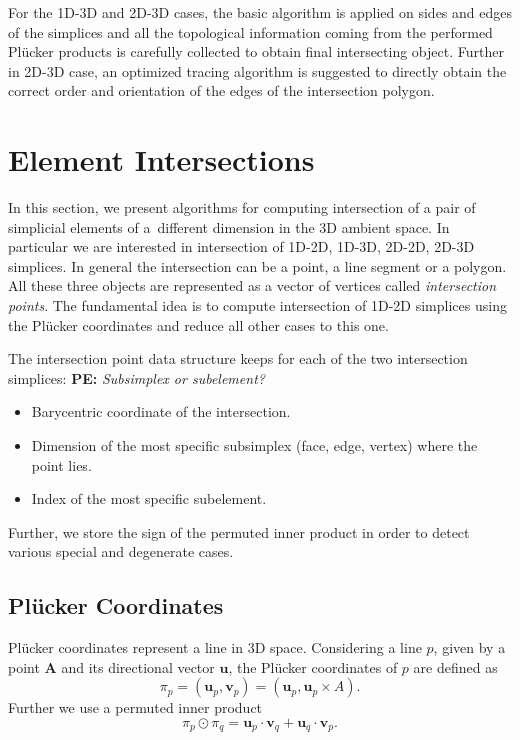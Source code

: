 \documentclass{elsarticle}
\newcommand{\figpath}{figures/}
\def\vc#1{\mathbf{\boldsymbol{#1}}}     %
\newcommand{\notePE}[1]{{\color{Orange} \textbf{PE: } \textit{#1}}}
\newcommand{\plucker}{Pl\"{u}cker }
\begin{document}
\begin{figure}[!htb]
  \centering
  \setcounter{subfigure}{0}
  \hspace{10pt}
\end{figure}
      
For the 1D-3D and 2D-3D cases, the basic algorithm is applied on sides and edges of the simplices and 
all the topological information coming from the performed \plucker products is carefully collected
to obtain final intersecting object.
Further in 2D-3D case, an optimized tracing algorithm is suggested to directly obtain the correct order and 
orientation of the edges of the intersection polygon.


\section{Element Intersections}
\label{sec:elements_intersections}
In this section, we present algorithms for computing intersection of a pair of simplicial elements of a~different dimension in the 3D ambient space.
In particular we are interested in intersection of 1D-2D, 1D-3D, 2D-2D, 2D-3D simplices. In general the intersection can be a point, a line segment or a polygon.
All these three objects are represented as a vector of vertices called \emph{intersection points}. The fundamental idea is to compute intersection of 1D-2D simplices using the 
\plucker coordinates and reduce all other cases to this one. 

The intersection point data structure keeps for each of the two intersection simplices:
\notePE{Subsimplex or subelement?}
\begin{itemize}
 \item Barycentric coordinate of the intersection.
 \item Dimension of the most specific subsimplex (face, edge, vertex) where the point lies.
 \item Index of the most specific subelement.
\end{itemize}
Further, we store the sign of the permuted inner product
in order to detect various special and degenerate cases.



\subsection{\plucker Coordinates}
\plucker coordinates represent a line in 3D space.
Considering a line $p$, given by a point $\vc A$ and its directional vector $\vc{u}$, 
the \plucker coordinates of $p$ are defined as
\[ \pi_p = (\vc{u}_p, \vc{v}_p) = (\vc{u}_p, \vc{u}_p\times A). \]
Further we use a permuted inner product
\[\pi_p \odot \pi_q = \vc{u}_p\cdot \vc{v}_q + \vc{u}_q \cdot \vc{v}_p. \]
\end{document}

